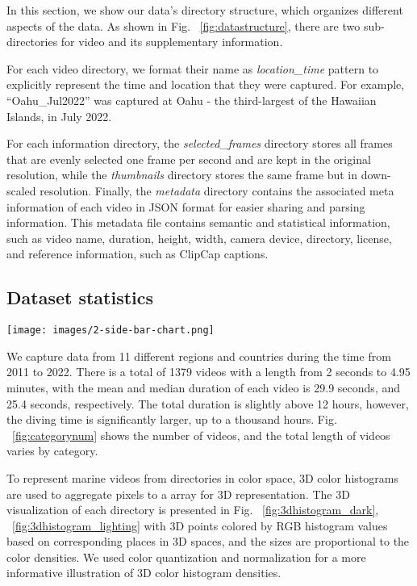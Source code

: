 \documentclass[runningheads]{llncs}
\begin{document}
In this section, we show our data's directory structure, which organizes different aspects of the data. As shown in Fig. ~\ref{fig:datastructure}, there are two sub-directories for video and its supplementary information. 

For each video directory, we format their name as \textit{location\_time} pattern to explicitly represent the time and location that they were captured. For example, ``Oahu\_Jul2022'' was captured at Oahu - the third-largest of the Hawaiian Islands, in July 2022. 

For each information directory, the \textit{selected\_frames} directory stores all frames that are evenly selected one frame per second and are kept in the original resolution, while the \textit{thumbnails} directory stores the same frame but in down-scaled resolution. Finally, the \textit{metadata} directory contains the associated meta information of each video in JSON format for easier sharing and parsing information. This metadata file contains semantic and statistical information, such as video name, duration, height, width, camera device, directory, license, and reference information, such as ClipCap captions. 

\subsection{Dataset statistics}

\begin{figure*}
\begin{center}
\centering
\texttt{[image: images/2-side-bar-chart.png]}
\end{center}
  \caption{The figure shows the number of videos and overall time duration for each region.}
\label{fig:categorynum}
\end{figure*}

We capture data from 11 different regions and countries during the time from 2011 to 2022. There is a total of 1379 videos with a length from 2 seconds to 4.95 minutes, with the mean and median duration of each video is 29.9 seconds, and 25.4 seconds, respectively. The total duration is slightly above 12 hours, however, the diving time is significantly larger, up to a thousand hours. Fig. ~\ref{fig:categorynum} shows the number of videos, and the total length of videos varies by category. 

To represent marine videos from directories in color space, 3D color histograms are used to aggregate pixels to a  array for 3D representation. The 3D visualization of each directory is presented in Fig. ~\ref{fig:3dhistogram_dark}, ~\ref{fig:3dhistogram_lighting} with 3D points colored by RGB histogram values based on corresponding places in 3D spaces, and the sizes are proportional to the color densities. We used color quantization and normalization for a more informative illustration of 3D color histogram densities.
\end{document}
